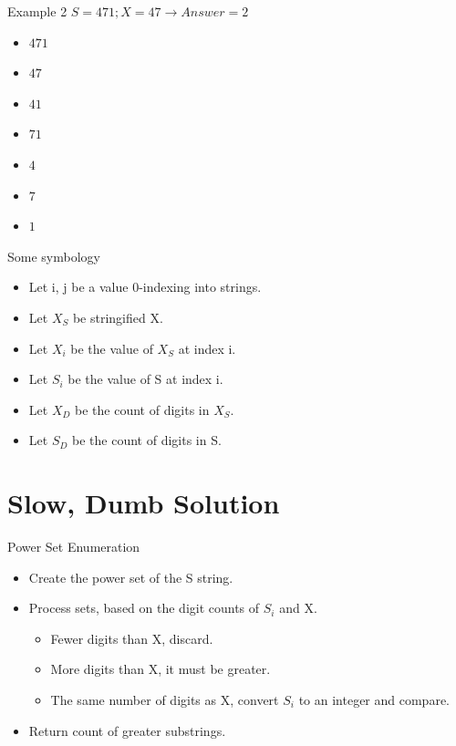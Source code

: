 \documentclass[10pt]{beamer}
\begin{document}
\begin{frame}{Example 2}
  \Large
  $S = 471; X = 47 \rightarrow Answer = 2$ \\
  \begin{itemize}[<+->]
    \item $471 $   
    \item $47  $    
    \item $41  $ 
    \item $71  $    
    \item $4   $ \only<8->{$\le 47$}
    \item $7   $ 
    \item $1   $ 
  \end{itemize}
\end{frame}

\begin{frame}{Some symbology}
  \Large
  \begin{itemize} %
    \item Let i, j be a value 0-indexing into strings.
    \item Let $X_{S}$ be stringified X.
    \item Let $X_{i}$ be the value of $X_{S}$  at index i.
    \item Let $S_{i}$ be the value of S at index i.
    \item Let $X_{D}$ be the count of digits in $X_{S}$.
    \item Let $S_{D}$ be the count of digits in S.
  \end{itemize}
\end{frame}

\section{Slow, Dumb Solution}

\begin{frame}{Power Set Enumeration}
  \Large
  \begin{itemize} %
    \item Create the power set of the S string.
    \item Process sets, based on the digit counts of $S_i$ and X.
      \begin{itemize}
        \large
        \item Fewer digits than X, discard.
        \item More digits than X, it must be greater.
        \item The same number of digits as X, convert $S_i$ to an integer and compare.
      \end{itemize}
    \item Return count of greater substrings.
  \end{itemize}
\end{frame}
\end{document}
